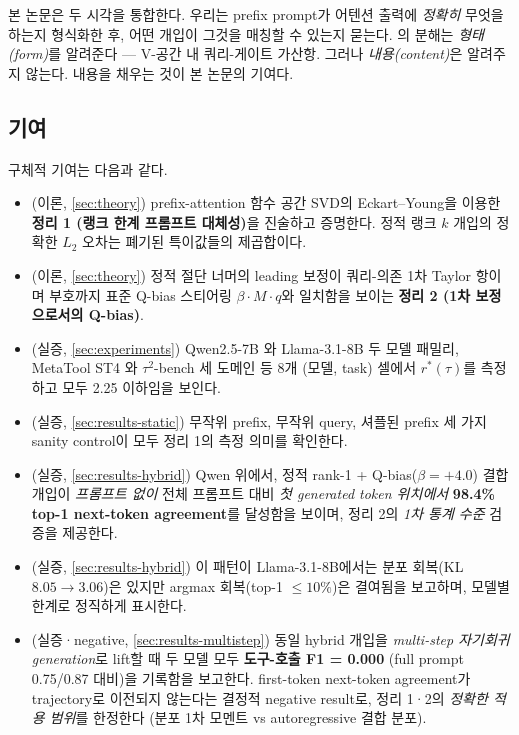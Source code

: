 \documentclass{article}
\theoremstyle{definition}
\begin{document}
본 논문은 두 시각을 통합한다. 우리는 prefix prompt가 어텐션 출력에 \emph{정확히} 무엇을 하는지 형식화한 후, 어떤 개입이 그것을 매칭할 수 있는지 묻는다. \citet{he2022unified}의 분해는 \emph{형태(form)}를 알려준다 --- V-공간 내 쿼리-게이트 가산항. 그러나 \emph{내용(content)}은 알려주지 않는다. 내용을 채우는 것이 본 논문의 기여다.

\subsection{기여}
\label{sec:contrib}
구체적 기여는 다음과 같다.
\begin{itemize}[leftmargin=*]
\item (이론, \cref{sec:theory}) prefix-attention 함수 공간 SVD의 Eckart--Young을 이용한 \textbf{정리 1 (랭크 한계 프롬프트 대체성)}을 진술하고 증명한다. 정적 랭크 $k$ 개입의 정확한 $L_2$ 오차는 폐기된 특이값들의 제곱합이다.
\item (이론, \cref{sec:theory}) 정적 절단 너머의 leading 보정이 쿼리-의존 1차 Taylor 항이며 부호까지 표준 Q-bias 스티어링 $\beta\cdot M\cdot q$와 일치함을 보이는 \textbf{정리 2 (1차 보정으로서의 Q-bias)}.
\item (실증, \cref{sec:experiments}) Qwen2.5-7B 와 Llama-3.1-8B 두 모델 패밀리, MetaTool ST4 와 $\tau^2$-bench 세 도메인 등 8개 (모델, task) 셀에서 $r^*(\tau)$를 측정하고 모두 2.25 이하임을 보인다.
\item (실증, \cref{sec:results-static}) 무작위 prefix, 무작위 query, 셔플된 prefix 세 가지 sanity control이 모두 정리 1의 측정 의미를 확인한다.
\item (실증, \cref{sec:results-hybrid}) Qwen 위에서, 정적 rank-1 + Q-bias($\beta{=}{+}4.0$) 결합 개입이 \emph{프롬프트 없이} 전체 프롬프트 대비 \emph{첫 generated token 위치에서} \textbf{98.4\% top-1 next-token agreement}를 달성함을 보이며, 정리 2의 \emph{1차 통계 수준} 검증을 제공한다.
\item (실증, \cref{sec:results-hybrid}) 이 패턴이 Llama-3.1-8B에서는 분포 회복(KL $8.05\to 3.06$)은 있지만 argmax 회복(top-1 $\leq 10\%$)은 결여됨을 보고하며, 모델별 한계로 정직하게 표시한다.
\item (실증·negative, \cref{sec:results-multistep}) 동일 hybrid 개입을 \emph{multi-step 자기회귀 generation}로 lift할 때 두 모델 모두 \textbf{도구-호출 F1 = 0.000} (full prompt 0.75/0.87 대비)을 기록함을 보고한다. first-token next-token agreement가 trajectory로 이전되지 않는다는 결정적 negative result로, 정리 1·2의 \emph{정확한 적용 범위}를 한정한다 (분포 1차 모멘트 vs autoregressive 결합 분포).
\end{itemize}
\end{document}
